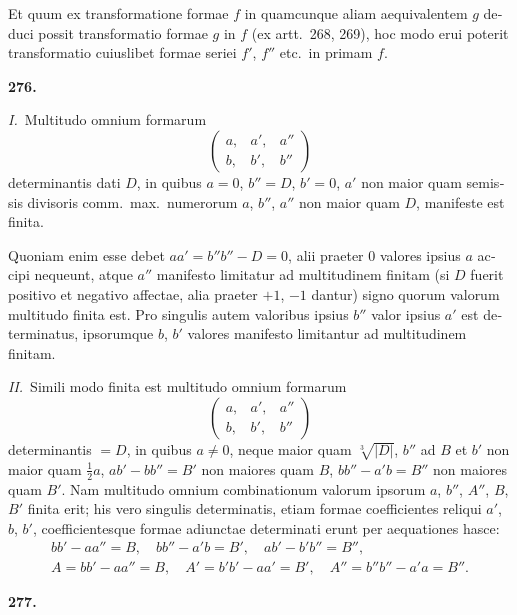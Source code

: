 \documentclass[12pt,a4paper]{article}
\theoremstyle{plain}
\theoremstyle{definition}
\theoremstyle{remark}
\begin{document}
\begin{otherlanguage}{latin}
Et quum ex transformatione formae $f$ in quamcunque aliam aequivalentem $g$ deduci possit transformatio formae $g$ in $f$ (ex artt.\ 268, 269), hoc modo erui poterit transformatio cuiuslibet formae seriei $f'$, $f''$ etc.\ in primam $f$.

\end{otherlanguage}

\begin{otherlanguage}{latin}

\textbf{276.}

\textit{I.}\ Multitudo omnium formarum
\[
\begin{pmatrix} a, & a', & a'' \\ b, & b', & b'' \end{pmatrix}
\]
determinantis dati $D$, in quibus $a = 0$, $b'' = D$, $b' = 0$, $a'$ non maior quam semissis divisoris comm.\ max.\ numerorum $a$, $b''$, $a''$ non maior quam $D$, manifeste est finita.

Quoniam enim esse debet $aa' = b''b'' - D = 0$, alii praeter $0$ valores ipsius $a$ accipi nequeunt, atque $a''$ manifesto limitatur ad multitudinem finitam (si $D$ fuerit positivo et negativo affectae, alia praeter $+1$, $-1$ dantur) signo quorum valorum multitudo finita est. Pro singulis autem valoribus ipsius $b''$ valor ipsius $a'$ est determinatus, ipsorumque $b$, $b'$ valores manifesto limitantur ad multitudinem finitam.

\textit{II.}\ Simili modo finita est multitudo omnium formarum
\[
\begin{pmatrix} a, & a', & a'' \\ b, & b', & b'' \end{pmatrix}
\]
determinantis $= D$, in quibus $a \neq 0$, neque maior quam $\sqrt[3]{|D|}$, $b''$ ad $B$ et $b'$ non maior quam $\frac{1}{2}a$, $ab' - bb'' = B'$ non maiores quam $B$, $bb'' - a'b = B''$ non maiores quam $B'$. Nam multitudo omnium combinationum valorum ipsorum $a$, $b''$, $A''$, $B$, $B'$ finita erit; his vero singulis determinatis, etiam formae coefficientes reliqui $a'$, $b$, $b'$, coefficientesque formae adiunctae determinati erunt per aequationes hasce:
\begin{gather*}
bb' - aa'' = B, \quad bb'' - a'b = B', \quad ab' - b'b'' = B'', \\
A = bb' - aa'' = B, \quad A' = b'b' - aa' = B', \quad A'' = b''b'' - a'a = B''.
\end{gather*}

\bigskip

\textbf{277.}


\end{otherlanguage}
\end{document}
